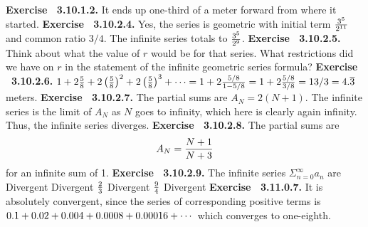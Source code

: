  {\noindent \protect \bf  Exercise ~3.10.1.2.} It ends up one-third of a meter forward from where it started. \protect \newline  \protect \newline  
 {\noindent \protect \bf  Exercise ~3.10.2.4.} Yes, the series is geometric with initial term $\protect \frac  {3^5}{2^{11}}$ and common ratio $3/4$. The infinite series totals to $ \protect \frac  {3^5}{2^9}$. \protect \newline  \protect \newline  
 {\noindent \protect \bf  Exercise ~3.10.2.5.} Think about what the value of $r$ would be for that series. What restrictions did we have on $r$ in the statement of the infinite geometric series formula? \protect \newline  \protect \newline  
 {\noindent \protect \bf  Exercise ~3.10.2.6.} $1+2\protect \frac  {5}{8}+2\left (\protect \frac  {5}{8}\right )^2+2\left (\protect \frac  {5}{8}\right )^3+\protect \cdots  =1+2\protect \frac  {5/8}{1-5/8}=1+2\protect \frac  {5/8}{3/8}=13/3=4.\protect \overline  {3}$ meters. \protect \newline  \protect \newline  
 {\noindent \protect \bf  Exercise ~3.10.2.7.} The partial sums are $A_N=2(N+1)$. The infinite series is the limit of $A_N$ as $N$ goes to infinity, which here is clearly again infinity. Thus, the infinite series diverges. \protect \newline  \protect \newline  
 {\noindent \protect \bf  Exercise ~3.10.2.8.} The partial sums are $$A_N=\protect \frac  {N+1}{N+3}$$ for an infinite sum of 1. \protect \newline  \protect \newline  
 {\noindent \protect \bf  Exercise ~3.10.2.9.} The infinite series $\Sigma _{n=0}^{\infty }a_n$ are \textbullet Divergent \textbullet Divergent  \textbullet $\protect \frac  {2}{3}$ \textbullet Divergent \textbullet $\protect \frac  {9}{4}$ \textbullet Divergent  \protect \newline  \protect \newline  
 {\noindent \protect \bf  Exercise ~3.11.0.7.} It is absolutely convergent, since the series of corresponding positive terms is $0.1+0.02+0.004+0.0008+0.00016+\protect \cdots  $ which converges to one-eighth.  \protect \newline  \protect \newline  
